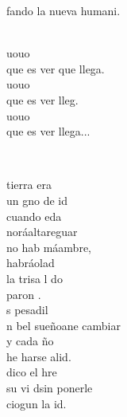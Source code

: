 \documentclass[12pt]{article}
\begin{document}
\begin{multicols*}{2}
\begin{cancion}
	 fando la nueva humani. \\\jump\\
	\begin{chorus}%
	uouo  \\
	que es ver que llega.\\
	uouo \\
	que es ver  lleg. \\
	uouo \\
	que es ver  llega...\\
	\end{chorus}%
	\jump\\
\end{cancion}%

\begin{cancion}%
	 tierra era\\
	 un gno de id\\
	cuando eda\\
	noráaltareguar\\
	no hab máambre,\\
	habráolad\\
	la trisa l do\\
	paron .\\
\jump
	s pesadil\\
	n bel sueñoane cambiar\\
	y cada ño\\
	he harse alid.\\
	 dico el hre \\
	 su vi dsin ponerle\\
	ciogun la id.\\
\end{cancion}%


\end{multicols*}
\end{document}

